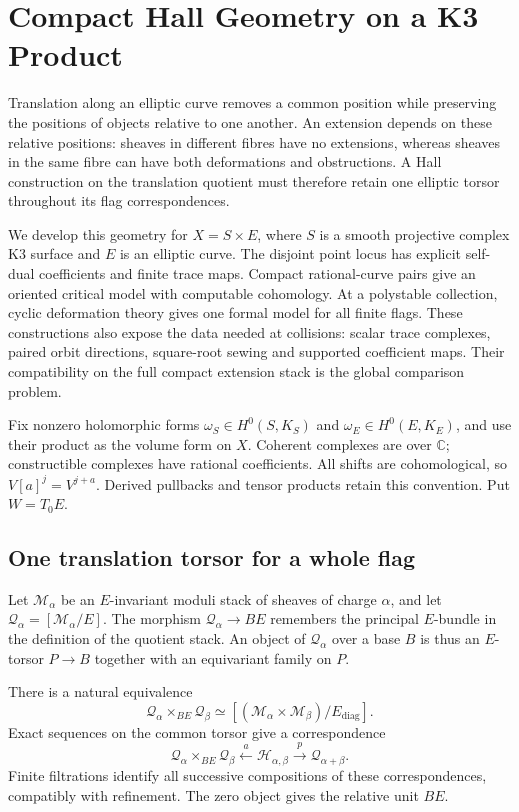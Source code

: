 \chapter{Compact Hall Geometry on a K3 Product}
\label{cycompact:chapter}

Translation along an elliptic curve removes a common position while
preserving the positions of objects relative to one another. An extension
depends on these relative positions: sheaves in different fibres have
no extensions, whereas sheaves in the same fibre can have both
deformations and obstructions. A Hall construction on the translation
quotient must therefore retain one elliptic torsor throughout its flag
correspondences.

We develop this geometry for $X=S\times E$, where $S$ is a smooth
projective complex K3 surface and $E$ is an elliptic curve. The disjoint
point locus has explicit self-dual coefficients and finite trace maps.
Compact rational-curve pairs give an oriented critical model with
computable cohomology. At a polystable collection, cyclic deformation
theory gives one formal model for all finite flags. These constructions
also expose the data needed at collisions: scalar trace complexes,
paired orbit directions, square-root sewing and supported coefficient
maps. Their compatibility on the full compact extension stack is the
global comparison problem.

Fix nonzero holomorphic forms $\omega_S\in H^0(S,K_S)$ and
$\omega_E\in H^0(E,K_E)$, and use their product as the volume form
on $X$. Coherent complexes are over $\mathbb C$; constructible
complexes have rational coefficients. All shifts are cohomological,
so $V[a]^j=V^{j+a}$. Derived pullbacks and tensor products retain
this convention. Put $W=T_0E$.

\section{One translation torsor for a whole flag}
\label{cycompact:sec:torsor}

Let $\mathcal M_\alpha$ be an $E$-invariant moduli stack of sheaves
of charge $\alpha$, and let $\mathcal Q_\alpha=[\mathcal M_\alpha/E]$.
The morphism $\mathcal Q_\alpha\to BE$ remembers the principal
$E$-bundle in the definition of the quotient stack. An object of
$\mathcal Q_\alpha$ over a base $B$ is thus an $E$-torsor
$P\to B$ together with an equivariant family on $P$.

\begin{proposition}\label{cycompact:prop:torsor}
There is a natural equivalence
\[
 \mathcal Q_\alpha\times_{BE}\mathcal Q_\beta
 \simeq[(\mathcal M_\alpha\times\mathcal M_\beta)/E_{\mathrm{diag}}].
\]
Exact sequences on the common torsor give a correspondence
\begin{equation}\label{cycompact:eq:span}
 \mathcal Q_\alpha\times_{BE}\mathcal Q_\beta
 \xleftarrow{\ a\ }\mathcal H_{\alpha,\beta}
 \xrightarrow{\ p\ }\mathcal Q_{\alpha+\beta}.
\end{equation}
Finite filtrations identify all successive compositions of these
correspondences, compatibly with refinement. The zero object gives
the relative unit $BE$.
\end{proposition}

